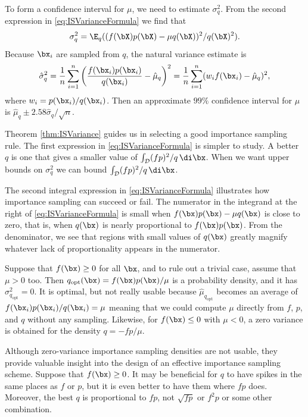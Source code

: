 To form a confidence interval for \(\mu\), we need to estimate \(\sigma_q^2\). From the second expression in \eqref{eq:ISVarianceFormula} we find that
\[
	\sigma_q^2 = \E_q((f(\bX)p(\bX) - \mu q(\bX))^2 / q(\bX)^2).
\]
Because \(\bx_i\) are sampled from \(q\), the natural variance estimate is
\begin{equation}
	\hat{\sigma}_q^2 = \frac{1}{n} \sum_{i=1}^n \left( \frac{f(\bx_i)p(\bx_i)}{q(\bx_i)} - \hat{\mu}_q \right)^2 = \frac{1}{n} \sum_{i=1}^n (w_i f(\bx_i) - \hat{\mu}_q)^2,
	\label{eq:ISVarianceEstimator}
\end{equation}
where \(w_i = p(\bx_i)/q(\bx_i)\). Then an approximate \(99\%\) confidence interval for \(\mu\) is \(\hat{\mu}_q \pm 2.58 \hat{\sigma}_q / \sqrt{n}\).

Theorem \ref{thm:ISVariance} guides us in selecting a good importance sampling rule. The first expression in \eqref{eq:ISVarianceFormula} is simpler to study. A better \(q\) is one that gives a smaller value of \(\int_{\mathcal{D}} (fp)^2/q \, \di \bx\). When we want upper bounds on \(\sigma_q^2\) we can bound \(\int_{\mathcal{D}} (fp)^2/q \, \di \bx\).

The second integral expression in \eqref{eq:ISVarianceFormula} illustrates how importance sampling can succeed or fail. The numerator in the integrand at the right of \eqref{eq:ISVarianceFormula} is small when \(f(\bx)p(\bx) - \mu q(\bx)\) is close to zero, that is, when \(q(\bx)\) is nearly proportional to \(f(\bx)p(\bx)\). From the denominator, we see that regions with small values of \(q(\bx)\) greatly magnify whatever lack of proportionality appears in the numerator.

Suppose that \(f(\bx) \geq 0\) for all \(\bx\), and to rule out a trivial case, assume that \(\mu > 0\) too. Then \(q_{\mathrm{opt}}(\bx) = f(\bx)p(\bx)/\mu\) is a probability density, and it has \(\sigma_{q_{\mathrm{opt}}}^2 = 0\). It is optimal, but not really usable because \(\hat{\mu}_{q_{\mathrm{opt}}}\) becomes an average of \(f(\bx_i)p(\bx_i)/q(\bx_i) = \mu\) meaning that we could compute \(\mu\) directly from \(f\), \(p\), and \(q\) without any sampling. Likewise, for \(f(\bx) \leq 0\) with \(\mu < 0\), a zero variance is obtained for the density \(q = -fp/\mu\).

Although zero-variance importance sampling densities are not usable, they provide valuable insight into the design of an effective importance sampling scheme. Suppose that \(f(\bx) \ge 0\). It may be beneficial for \(q\) to have spikes in the same places as \(f\) or \(p\), but it is even better to have them where \(fp\) does. Moreover, the best \(q\) is proportional to \(fp\), not \(\sqrt{fp}\) or \(f^2p\) or some other combination.

